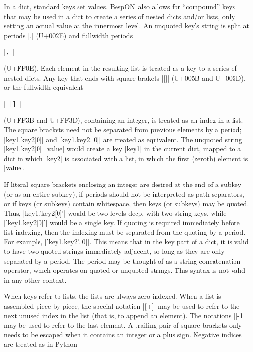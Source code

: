 \documentclass[11pt]{article}
\newcommand{\bespon}{BespON}
\begin{document}
In a dict, standard keys set values.  \bespon\ also allows for ``compound'' keys that may be used in a dict to create a series of nested dicts and/or lists, only setting an actual value at the innermost level.  An unquoted key's string is split at periods |.| (U+002E) and fullwidth periods \begin{CJK*}{UTF8}{gkai}|．|\end{CJK*} (U+FF0E).  Each element in the resulting list is treated as a key to a series of nested dicts.  Any key that ends with square brakets |[]| (U+005B and U+005D), or the fullwidth equivalent \begin{CJK*}{UTF8}{gkai}|［］|\end{CJK*} (U+FF3B and U+FF3D), containing an integer, is treated as an index in a list.  The square brackets need not be separated from previous elements by a period; |key1.key2[0]| and |key1.key2.[0]| are treated as equivalent.  The unquoted string |key1.key2[0]=value| would create a key |key1| in the current dict, mapped to a dict in which |key2| is associated with a list, in which the first (zeroth) element is |value|.

If literal square brackets enclosing an integer are desired at the end of a subkey (or as an entire subkey), if periods should not be interpreted as path separators, or if keys (or subkeys) contain whitespace, then keys (or subkeys) may be quoted.  Thus, |key1.'key2[0]'| would be two levels deep, with two string keys, while |'key1.key2[0]'| would be a single key.  If quoting is required immediately before list indexing, then the indexing must be separated from the quoting by a period.  For example, |'key1.key2'.[0]|. This means that in the key part of a dict, it is valid to have two quoted strings immediately adjacent, so long as they are only separated by a period.  The period may be thought of as a string concatenation operator, which operates on quoted or unquoted strings.  This syntax is not valid in any other context.

When keys refer to lists, the lists are always zero-indexed.  When a list is assembled piece by piece, the special notation |[+]| may be used to refer to the next unused index in the list (that is, to append an element).  The notations |[-1]| may be used to refer to the last element.  A trailing pair of square brackets only needs to be escaped when it contains an integer or a plus sign.  Negative indices are treated as in Python.
\end{document}
